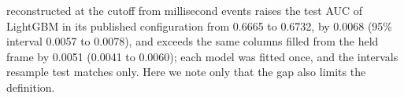 reconstructed at the cutoff from millisecond events raises the test AUC of LightGBM in its published
configuration from 0.6665 to 0.6732, by 0.0068 (95\% interval 0.0057 to 0.0078), and exceeds the same
columns filled from the held frame by 0.0051 (0.0041 to 0.0060); each model was fitted once, and the
intervals resample test matches only. Here we note only that the gap also limits the definition.

